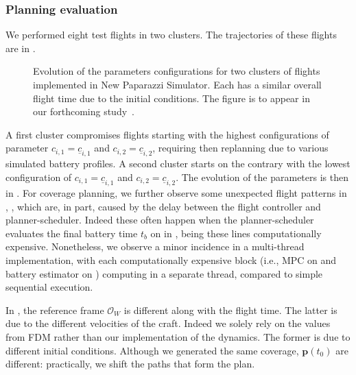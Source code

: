\subsubsection*{Planning evaluation}

We performed eight test flights in two clusters. The trajectories of these flights are in . 
\begin{figure}[h!]
  \centering
  \selectfont
  \footnotesize    
  
  \caption[Evolution of the parameters configurations in NPS]{Evolution of the parameters configurations for two clusters of flights implemented in New Paparazzi Simulator. Each has a similar overall flight time due to the initial conditions. The figure is to appear in our forthcoming study~\citep{seewald202Xenergy}.}
  \label{fig:ctls-pprz}
\end{figure}
A first cluster  compromises flights starting with the highest configurations of parameter $c_{i,1}=\underline{c}_{i,1}$ and $c_{i,2}=\underline{c}_{i,2}$, requiring then replanning due to various simulated battery profiles. A second cluster  starts on the contrary with the lowest configuration of $c_{i,1}=\underline{c}_{i,1}$ and $c_{i,2}=\underline{c}_{i,2}$. The evolution of the parameters is then in . For coverage planning, we further observe some unexpected flight patterns in , , which are, in part, caused by the delay between the flight controller and planner-scheduler. Indeed these often happen when the planner-scheduler evaluates the final battery time $t_b$ on  in , being these lines computationally expensive. Nonetheless, we observe a minor incidence in a multi-thread implementation, with each computationally expensive block (i.e., MPC on  and battery estimator on ) computing in a separate thread, compared to simple sequential execution.

In , the reference frame $\mathcal{O}_W$ is different along with the flight time. The latter is due to the different velocities of the craft. Indeed we solely rely on the values from FDM rather than our implementation of the dynamics. The former is due to different initial conditions. Although we generated the same coverage, $\mathbf{p}(t_0)$ are different: practically, we shift the paths that form the plan.

